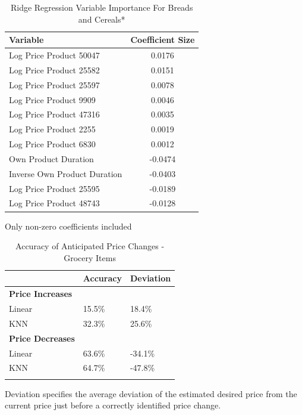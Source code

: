 \documentclass[11pt]{article}
\begin{document}
\begin{table}
    \centering
        \caption{Ridge Regression Variable Importance For Breads and Cereals*}
        \vspace{2mm}
    \begin{tabular}{l | c } 
 \hline
  \textbf{Variable} & \textbf{Coefficient Size}  \\ [0.5ex] 
 \hline\hline
 Log Price Product 50047 & 0.0176   \\
 Log Price Product 25582 &  0.0151  \\
 Log Price Product 25597 &  0.0078   \\
 Log Price Product 9909 &  0.0046   \\
 Log Price Product 47316 & 0.0035   \\
 Log Price Product 2255 &  0.0019  \\
 Log Price Product 6830 &  0.0012  \\
 Own Product Duration &   -0.0474 \\
 Inverse Own Product Duration &  -0.0403   \\
 Log Price Product 25595 &  -0.0189   \\
 Log Price Product 48743 &  -0.0128   \\
  \hline
\end{tabular}
\begin{tablenotes}\footnotesize
\item *Only non-zero coefficients included 
\end{tablenotes}
\label{Table 5}
\end{table}

\clearpage
\begin{table}[ht]
    \centering
        \caption{Accuracy of Anticipated Price Changes - Grocery Items}
        \vspace{.5cm}
    \begin{tabular}{l | l  l } 
 \hline
  \textbf{} & \textbf{Accuracy} & \textbf{Deviation}  \\ [0.5ex] 
 \hline\hline
 \textbf{Price Increases} \\
 Linear & 15.5\% & 18.4\%    \\
   KNN & 32.3\%  & 25.6\%  \\
  \hline
   \textbf{Price Decreases} \\
 Linear & 63.6\% &  -34.1\%  \\
   KNN & 64.7\% &  -47.8\%  \\
  \hline
  \label{Table 6}
\end{tabular}
\begin{tablenotes}\footnotesize
\item Deviation specifies the average deviation of the estimated desired price from the current price just before a correctly identified price change.
\end{tablenotes}
\end{table}
\end{document}
